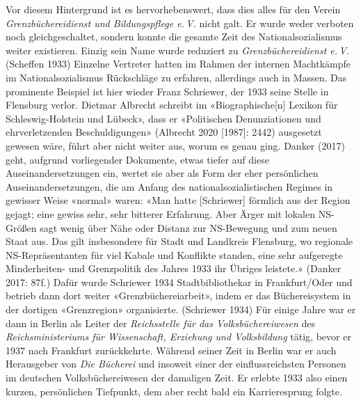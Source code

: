\documentclass[a4paper,
fontsize=11pt,
oneside,
numbers=noperiodatend,
parskip=half-,
bibliography=totoc,
final
]{scrartcl}
\begin{document}
Vor diesem Hintergrund ist es hervorhebenswert, dass dies alles für den
Verein \emph{Grenzbüchereidienst und Bildungspflege e.\,V.} nicht galt. Er
wurde weder verboten noch gleichgeschaltet, sondern konnte die gesamte
Zeit des Nationalsozialismus weiter existieren. Einzig sein Name wurde
reduziert zu \emph{Grenzbüchereidienst e.\,V.} (Scheffen 1933) Einzelne
Vertreter hatten im Rahmen der internen Machtkämpfe im
Nationalsozialismus Rückschläge zu erfahren, allerdings auch in Massen.
Das prominente Beispiel ist hier wieder Franz Schriewer, der 1933 seine
Stelle in Flensburg verlor. Dietmar Albrecht schreibt im
«Biographische{[}n{]} Lexikon für Schleswig-Holstein und Lübeck», dass
er «Politischen Denunziationen und ehrverletzenden Beschuldigungen»
(Albrecht 2020 {[}1987{]}: 2442) ausgesetzt gewesen wäre, führt aber
nicht weiter aus, worum es genau ging. Danker (2017) geht, aufgrund
vorliegender Dokumente, etwas tiefer auf diese Auseinandersetzungen ein,
wertet sie aber als Form der eher persönlichen Auseinandersetzungen, die
am Anfang des nationalsozialistischen Regimes in gewisser Weise «normal»
waren: «Man hatte {[}Schriewer{]} förmlich aus der Region gejagt; eine
gewiss sehr, sehr bitterer Erfahrung. Aber Ärger mit lokalen NS-Größen
sagt wenig über Nähe oder Distanz zur NS-Bewegung und zum neuen Staat
aus. Das gilt insbesondere für Stadt und Landkreis Flensburg, wo
regionale NS-Repräsentanten für viel Kabale und Konflikte standen, eine
sehr aufgeregte Minderheiten- und Grenzpolitik des Jahres 1933 ihr
Übriges leistete.» (Danker 2017: 87f.) Dafür wurde Schriewer 1934
Stadtbibliothekar in Frankfurt/Oder und betrieb dann dort weiter
«Grenzbüchereiarbeit», indem er das Büchereisystem in der dortigen
«Grenzregion» organisierte. (Schriewer 1934) Für einige Jahre war er
dann in Berlin als Leiter der \emph{Reichsstelle für das
Volksbüchereiwesen} des \emph{Reichsministeriums für Wissenschaft,
Erziehung und Volksbildung} tätig, bevor er 1937 nach Frankfurt
zurückkehrte. Während seiner Zeit in Berlin war er auch Herausgeber von
\emph{Die Bücherei} und insoweit einer der einflussreichsten Personen im
deutschen Volksbüchereiwesen der damaligen Zeit. Er erlebte 1933 also
einen kurzen, persönlichen Tiefpunkt, dem aber recht bald ein
Karrieresprung folgte.
\end{document}

